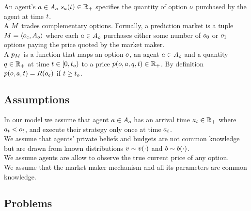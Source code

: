 An agent's $a\in A_o$  
$s_a(t) \in \mathbb{R}_+$ specifies the quantity of option 
$o$ purchased by the agent at time $t$.\\

A  $M$ trades complementary options. 
Formally, a prediction market is a tuple $M = 
\left<o_c, A_o \right>$ where each  
$a\in A_o$ purchases 
either some number of $o_0$ or $o_1$ options paying the price quoted by the 
market maker.\\


A  $p_M$ is a function 
that maps an option $o$, an agent $a \in A_o$ 
and a quantity $q\in\mathbb{R}_+$ at time $t \in [0,t_o)$ 
to a price $p(o,a,q, t) \in \mathbb{R}_+$. 
By definition $p(o,a, t) = R(o_e)$ if 
$t \ge t_o$.

\subsection{Assumptions}

In our model we assume that agent $a \in A_o$ has an arrival time 
$a_t \in \mathbb{R}_+$ where $a_t < o_t$, 
and execute their strategy only once at time $a_t$.\\

We assume that agents' private beliefs and budgets are not common knowledge
but are drawn from known distributions $v \sim v(\cdot)$ and
$b \sim b(\cdot)$.\\

We assume agents are allow to observe the true current price of any option.\\

We assume that the market maker mechanism and all its parameters are common knowledge.\\


\subsection{Problems}
  
